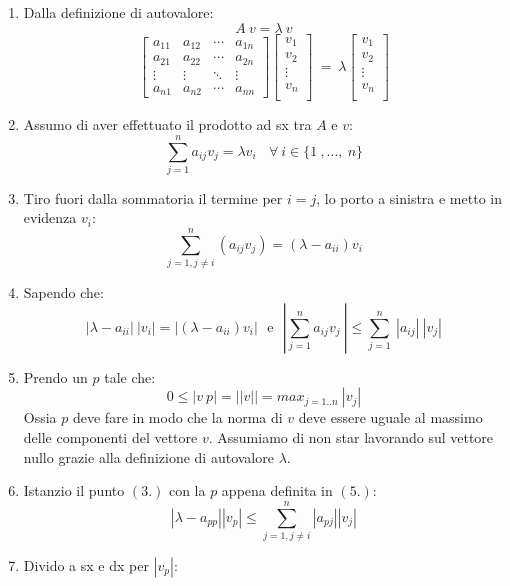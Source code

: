\documentclass{article}
\begin{document}
\begin{enumerate}
    \item Dalla definizione di autovalore:
    \[ A\:v = \lambda \: v \]
   \[ \begin{bmatrix}
    a_{11} & a_{12} & \cdots & a_{1n}\\
    a_{21} & a_{22} & \cdots & a_{2n}\\
    \vdots & \vdots & \ddots & \vdots \\
    a_{n1} & a_{n2} & \cdots & a_{nn}
    \end{bmatrix} 
    \begin{bmatrix}
        v_1 \\
        v_2 \\
        \vdots \\
        v_n \\
    \end{bmatrix} \: = \: \lambda 
    \begin{bmatrix}
        v_1 \\
        v_2 \\
        \vdots \\
        v_n \\
    \end{bmatrix} \]
    \vspace*{5px}
    \item Assumo di aver effettuato il prodotto ad sx tra $A$ e $v$:
    \[ \sum_{j=1}^{n} a_{ij}v_{j} = \lambda v_{i} \:\:\:\: \forall \: i \in \{ 1\:,... ,\:n \}  \]
    \item Tiro fuori dalla sommatoria il termine per $i=j$, lo porto a sinistra e metto in evidenza $v_{i}$:
    \[ \sum_{j=1,j\neq i}^{n} (a_{ij}v_{j})  = (\lambda - a_{ii} )v_{i} \]
    \newpage
    \item Sapendo che:
    \[ \boxed{|\lambda-a_{ii}|\:|v_{i}|  =  | (\lambda - a_{ii})v_{i} |} \:\:\: \text{e} \:\:\: \boxed{|\sum_{j=1}^{n} a_{ij}v_{j} \:  | \leq \sum_{j=1}^{n} \:|a_{ij}|\:|v_{j}|} \]
    \item Prendo un $p$ tale che:
    \[ 0 \leq |v\:p| = ||v|| = max_{j=1..n} \: |v_{j}| \]
    Ossia $p$ deve fare in modo che la norma di $v$ deve essere uguale al massimo delle componenti del vettore $v$. Assumiamo di non star lavorando sul vettore nullo grazie alla definizione di autovalore $\lambda$.
    \item Istanzio il punto $(3.)$ con la $p$ appena definita in $(5.)$:
    \[ |\lambda - a_{pp }|  |v_{p}| \leq \sum_{j=1,j \neq i}^{n} |a_{pj}| |v_{j}| \]
    \item Divido a sx e dx per $|v_{p}|$:

\end{enumerate}
\end{document}
